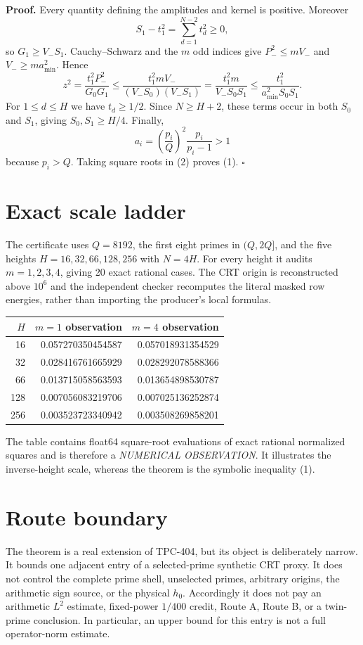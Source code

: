 \documentclass[11pt]{article}
\begin{document}
\textbf{Proof.}
Every quantity defining the amplitudes and kernel is positive.  Moreover
\[
 S_1-t_1^2=\sum_{d=1}^{N-2}t_d^2\geq0,
\]
so $G_1\geq V_-S_1$.  Cauchy--Schwarz and the $m$ odd indices give
$P_-^2\leq mV_-$ and $V_-\geq ma_{\min}^2$.  Hence
\[
 z^2=\frac{t_1^2P_-^2}{G_0G_1}
 \leq\frac{t_1^2mV_-}{(V_-S_0)(V_-S_1)}
 =\frac{t_1^2m}{V_-S_0S_1}
 \leq\frac{t_1^2}{a_{\min}^2S_0S_1}. \tag{2}
\]
For $1\leq d\leq H$ we have $t_d\geq1/2$.  Since $N\geq H+2$, these terms
occur in both $S_0$ and $S_1$, giving $S_0,S_1\geq H/4$.  Finally,
\[
 a_i=\left(\frac{p_i}{Q}\right)^2\frac{p_i}{p_i-1}>1
\]
because $p_i>Q$.  Taking square roots in (2) proves (1). \hfill$\square$

\section{\hspace{0.2em}Exact scale ladder}
The certificate uses $Q=8192$, the first eight primes in $(Q,2Q]$, and the
five heights $H=16,32,66,128,256$ with $N=4H$.  For every height it audits
$m=1,2,3,4$, giving 20 exact rational cases.  The CRT origin is reconstructed
above $10^6$ and the independent checker recomputes the literal masked row
energies, rather than importing the producer's local formulas.

\begin{center}
\begin{tabular}{@{}rrr@{}}
\toprule
$H$ & $m=1$ observation & $m=4$ observation\\
\midrule
16  & 0.057270350454587 & 0.057018931354529\\
32  & 0.028416761665929 & 0.028292078588366\\
66  & 0.013715058563593 & 0.013654898530787\\
128 & 0.007056083219706 & 0.007025136252874\\
256 & 0.003523723340942 & 0.003508269858201\\
\bottomrule
\end{tabular}
\end{center}

The table contains float64 square-root evaluations of exact rational
normalized squares and is therefore a \emph{NUMERICAL OBSERVATION}.  It
illustrates the inverse-height scale, whereas the theorem is the symbolic
inequality (1).

\section{\hspace{0.2em}Route boundary}
The theorem is a real extension of TPC-404, but its object is deliberately
narrow.  It bounds one adjacent entry of a selected-prime synthetic CRT
proxy.  It does not control the complete prime shell, unselected primes,
arbitrary origins, the arithmetic sign source, or the physical $h_0$.
Accordingly it does not pay an arithmetic $L^2$ estimate, fixed-power
$1/400$ credit, Route A, Route B, or a twin-prime conclusion.  In particular,
an upper bound for this entry is not a full operator-norm estimate.
\end{document}
